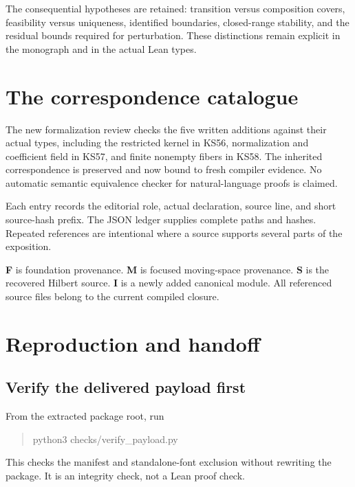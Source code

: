 \documentclass[11pt]{article}
\begin{document}
The consequential hypotheses are retained: transition versus composition covers, feasibility versus uniqueness, identified boundaries, closed-range stability, and the residual bounds required for perturbation. These distinctions remain explicit in the monograph and in the actual Lean types.

\clearpage\section{The correspondence catalogue}
The new formalization review checks the five written additions against their actual types, including the restricted kernel in KS56, normalization and coefficient field in KS57, and finite nonempty fibers in KS58. The inherited correspondence is preserved and now bound to fresh compiler evidence. No automatic semantic equivalence checker for natural-language proofs is claimed.

Each entry records the editorial role, actual declaration, source line, and short source-hash prefix. The JSON ledger supplies complete paths and hashes. Repeated references are intentional where a source supports several parts of the exposition.

\textbf{F} is foundation provenance. \textbf{M} is focused moving-space provenance. \textbf{S} is the recovered Hilbert source. \textbf{I} is a newly added canonical module. All referenced source files belong to the current compiled closure.


\clearpage\section{Reproduction and handoff}
\subsection{Verify the delivered payload first}
From the extracted package root, run
\begin{quote}\small\ttfamily
python3 checks/verify\_payload.py
\end{quote}
This checks the manifest and standalone-font exclusion without rewriting the package. It is an integrity check, not a Lean proof check.
\end{document}
